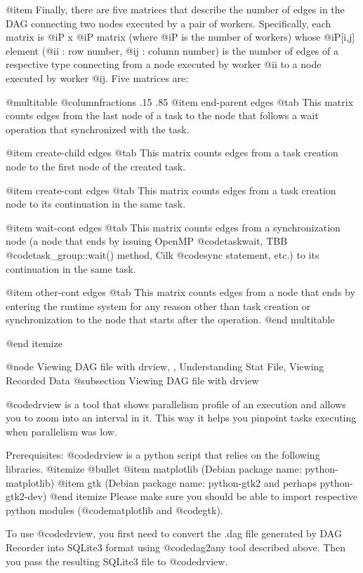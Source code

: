 @item Finally, there are five matrices that describe the number of edges
in the DAG connecting two nodes executed by a pair of workers.
Specifically, each matrix is @i{P} x @i{P} matrix (where @i{P} is the
number of workers) whose @i{P[i,j]} element (@i{i} : row number, @i{j} :
column number) is the number of edges of a respective type connecting
from a node executed by worker @i{i} to a node executed by worker @i{j}.
Five matrices are:

@multitable @columnfractions .15 .85
@item end-parent edges @tab
This matrix counts edges
from the last node of a task to the node that follows a wait
operation that synchronized with the task.

@item create-child edges @tab 
This matrix counts edges
from a task creation node to the first node of the created task.

@item create-cont edges @tab 
This matrix counts edges from
a task creation node to its continuation in the same task.

@item wait-cont edges @tab 
This matrix counts edges from
a synchronization node (a node that ends by issuing OpenMP 
@code{taskwait},
TBB @code{task_group::wait()} method, 
Cilk @code{sync} statement, etc.) to its continuation in 
the same task.

@item other-cont edges @tab
This matrix counts edges from
a node that ends by entering the runtime system for any reason other
than task creation or synchronization to the node that starts after the
operation.
@end multitable

@end itemize

@node Viewing DAG file with drview,  , Understanding Stat File, Viewing Recorded Data
@subsection Viewing DAG file with drview

@code{drview} is a tool that shows parallelism profile of an execution
and allows you to zoom into an interval in it.  This way it helps you
pinpoint tasks executing when parallelism was low.

Prerequisites:  @code{drview} is a python script that 
relies on the following libraries.
@itemize @bullet
@item matplotlib (Debian package name: python-matplotlib)
@item gtk (Debian package name: python-gtk2 and perhaps python-gtk2-dev)
@end itemize
Please make sure you should be able to import respective python modules
(@code{matplotlib} and @code{gtk}).

To use @code{drview}, you first need to convert the .dag file 
generated by DAG Recorder into
SQLite3 format using @code{dag2any} tool described above.  
Then you pass the resulting
SQLite3 file to @code{drview}.

